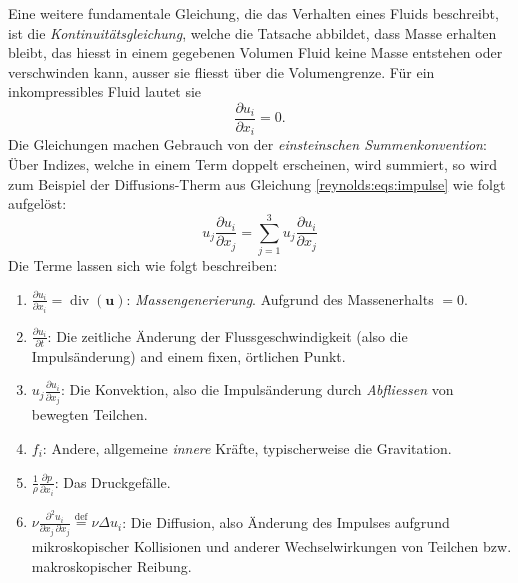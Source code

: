 Eine weitere fundamentale Gleichung, die das Verhalten eines Fluids beschreibt, ist die \emph{Kontinuitätsgleichung},
welche die Tatsache abbildet, dass Masse erhalten bleibt, das hiesst in einem gegebenen Volumen Fluid keine Masse
entstehen oder verschwinden kann, ausser sie fliesst über die Volumengrenze. Für ein inkompressibles Fluid lautet sie
%
\begin{equation}
    \label{reynolds:eqs:mass}
    \frac{\partial u_i}{\partial x_i} = 0.
\end{equation}
%
Die Gleichungen machen Gebrauch von der \emph{einsteinschen Summenkonvention}: Über Indizes, welche in einem Term doppelt
erscheinen, wird summiert, so wird zum Beispiel der Diffusions-Therm aus Gleichung \eqref{reynolds:eqs:impulse} wie folgt aufgelöst:
%
\begin{equation}
u_j \frac{\partial u_i}{\partial x_j} = \sum_{j=1}^{3} u_j \frac{\partial u_i}{\partial x_j}
\end{equation}
%
Die Terme lassen sich wie folgt beschreiben:
%
\begin{enumerate}
    \item $\frac{\partial u_i}{\partial x_i} = \operatorname{div}(\mathbf{u})$: \emph{Massengenerierung}.
    Aufgrund des Massenerhalts $ = 0$.
    \item $\frac{\partial u_i}{\partial t}$: Die zeitliche Änderung der Flussgeschwindigkeit (also die 
        Impulsänderung) and einem fixen, örtlichen Punkt.
    \item $u_j \frac{\partial u_i}{\partial x_j}$: Die Konvektion, also die Impulsänderung durch \emph{Abfliessen}
        von bewegten Teilchen.
    \item $f_i$: Andere, allgemeine \emph{innere} Kräfte, typischerweise die Gravitation.
    \item $\frac{1}{\rho} \frac{\partial p}{\partial x_i}$: Das Druckgefälle.
    \item $\nu \frac{\partial^2 u_i}{\partial x_j\, \partial x_j} \overset{\text{def}}{=} \nu \Delta u_i$: Die Diffusion, also Änderung des Impulses
        aufgrund mikroskopischer Kollisionen und anderer Wechselwirkungen von Teilchen bzw.
        makroskopischer Reibung.
\end{enumerate}
%
